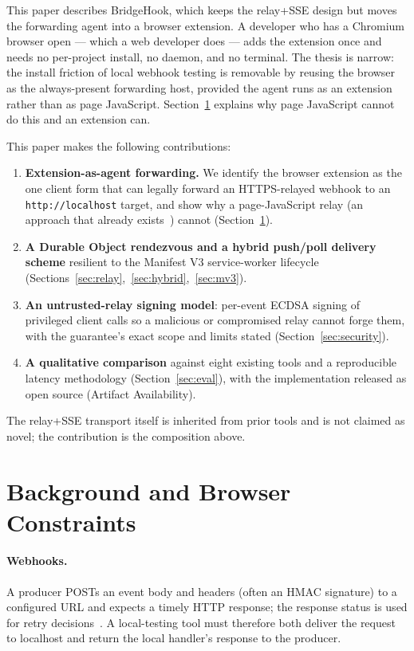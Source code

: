 \documentclass[11pt]{article}
\begin{document}
This paper describes BridgeHook, which keeps the relay+SSE design but moves the
forwarding agent into a browser extension. A developer who has a Chromium
browser open --- which a web developer does --- adds the extension once and
needs no per-project install, no daemon, and no terminal. The thesis is narrow:
the install friction of local webhook testing is removable by reusing the
browser as the always-present forwarding host, provided the agent runs as an
extension rather than as page JavaScript. Section~\ref{sec:background} explains
why page JavaScript cannot do this and an extension can.

This paper makes the following contributions:
\begin{enumerate}
  \item \textbf{Extension-as-agent forwarding.} We identify the browser
        extension as the one client form that can legally forward an
        HTTPS-relayed webhook to an \texttt{http://localhost} target, and show
        why a page-JavaScript relay (an approach that already
        exists~\cite{hookslocalhost}) cannot
        (Section~\ref{sec:background}).
  \item \textbf{A Durable Object rendezvous and a hybrid push/poll delivery
        scheme} resilient to the Manifest V3 service-worker lifecycle
        (Sections~\ref{sec:relay},~\ref{sec:hybrid},~\ref{sec:mv3}).
  \item \textbf{An untrusted-relay signing model}: per-event ECDSA signing of
        privileged client calls so a malicious or compromised relay cannot
        forge them, with the guarantee's exact scope and limits stated
        (Section~\ref{sec:security}).
  \item \textbf{A qualitative comparison} against eight existing tools and a
        reproducible latency methodology (Section~\ref{sec:eval}), with the
        implementation released as open source (Artifact Availability).
\end{enumerate}
The relay+SSE transport itself is inherited from prior tools and is not claimed
as novel; the contribution is the composition above.

\section{Background and Browser Constraints}
\label{sec:background}

\paragraph{Webhooks.} A producer POSTs an event body and headers (often an
HMAC signature) to a configured URL and expects a timely HTTP response; the
response status is used for retry decisions~\cite{stripewebhooks,githubwebhooks}.
A local-testing tool must therefore both deliver the request to localhost and
return the local handler's response to the producer.
\end{document}
